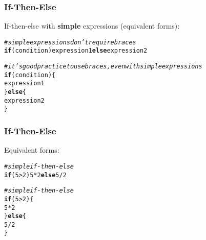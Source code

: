 \documentclass[12pt]{beamer}\usepackage[]{graphicx}\usepackage[]{color}
\makeatletter
\newcommand{\hlnum}[1]{\textcolor[rgb]{0.686,0.059,0.569}{#1}}%
\newcommand{\hlcom}[1]{\textcolor[rgb]{0.678,0.584,0.686}{\textit{#1}}}%
\newcommand{\hlopt}[1]{\textcolor[rgb]{0,0,0}{#1}}%
\newcommand{\hlstd}[1]{\textcolor[rgb]{0.345,0.345,0.345}{#1}}%
\newcommand{\hlkwa}[1]{\textcolor[rgb]{0.161,0.373,0.58}{\textbf{#1}}}%
\newenvironment{kframe}{%
 \def\at@end@of@kframe{}%
 \ifinner\ifhmode%
  \def\at@end@of@kframe{\end{minipage}}%
  \begin{minipage}{\columnwidth}%
 \fi\fi%
 \def\FrameCommand##1{\hskip\@totalleftmargin \hskip-\fboxsep
 \colorbox{shadecolor}{##1}\hskip-\fboxsep
     \hskip-\linewidth \hskip-\@totalleftmargin \hskip\columnwidth}%
 \MakeFramed {\advance\hsize-\width
   \@totalleftmargin\z@ \linewidth\hsize
   \@setminipage}}%
 {\par\unskip\endMakeFramed%
 \at@end@of@kframe}
\newenvironment{knitrout}{}{} %
\makeatother
\begin{document}
\begin{frame}[fragile]
\frametitle{If-Then-Else}

If-then-else with \textbf{simple} expressions (equivalent forms):

\begin{knitrout}\footnotesize
{}\color{fgcolor}\begin{kframe}
\begin{alltt}
\hlcom{# simple expressions don't require braces}
\hlkwa{if} \hlstd{(condition) expression1} \hlkwa{else} \hlstd{expression2}

\hlcom{# it's good practice to use braces, even with simple expressions}
\hlkwa{if} \hlstd{(condition) \{}
  \hlstd{expression1}
\hlstd{\}} \hlkwa{else} \hlstd{\{}
  \hlstd{expression2}
\hlstd{\}}
\end{alltt}
\end{kframe}
\end{knitrout}

\end{frame}


\begin{frame}[fragile]
\frametitle{If-Then-Else}

Equivalent forms:
\begin{knitrout}\footnotesize
{}\color{fgcolor}\begin{kframe}
\begin{alltt}
\hlcom{# simple if-then-else}
\hlkwa{if} \hlstd{(}\hlnum{5} \hlopt{>} \hlnum{2}\hlstd{)} \hlnum{5} \hlopt{*} \hlnum{2} \hlkwa{else} \hlnum{5} \hlopt{/} \hlnum{2}

\hlcom{# simple if-then-else}
\hlkwa{if} \hlstd{(}\hlnum{5} \hlopt{>} \hlnum{2}\hlstd{) \{}
  \hlnum{5} \hlopt{*} \hlnum{2}
\hlstd{\}} \hlkwa{else} \hlstd{\{}
  \hlnum{5} \hlopt{/} \hlnum{2}
\hlstd{\}}
\end{alltt}
\end{kframe}
\end{knitrout}

\end{frame}

\end{document}
